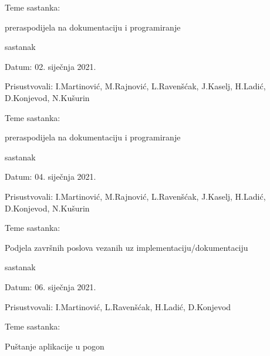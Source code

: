 \begin{packed_enum}
\begin{packed_item}
				\item Teme sastanka: 
				\begin{packed_item}
					\item   preraspodijela na dokumentaciju i programiranje
				\end{packed_item}
			\end{packed_item}
				\item sastanak
				\item[] \begin{packed_item}
					\item Datum: 02. siječnja 2021.
					\item Prisustvovali: I.Martinović, M.Rajnović, L.Ravenšćak, J.Kaselj, H.Ladić, D.Konjevod, N.Kušurin
					\item Teme sastanka: 
					\begin{packed_item}
						\item   preraspodijela na dokumentaciju i programiranje
					\end{packed_item}
				\end{packed_item}
			\item sastanak
			\item[] \begin{packed_item}
				\item Datum: 04. siječnja 2021.
				\item Prisustvovali: I.Martinović, M.Rajnović, L.Ravenšćak, J.Kaselj, H.Ladić, D.Konjevod, N.Kušurin
				\item Teme sastanka: 
				\begin{packed_item}
					\item  Podjela završnih poslova vezanih uz implementaciju/dokumentaciju
				\end{packed_item}
			\end{packed_item}
		\item sastanak
		\item[] \begin{packed_item}
			\item Datum: 06. siječnja 2021.
			\item Prisustvovali: I.Martinović,  L.Ravenšćak,  H.Ladić, D.Konjevod
			\item Teme sastanka: 
			\begin{packed_item}
				\item   Puštanje aplikacije u pogon
			\end{packed_item}
		\end{packed_item}
\item[] \begin{packed_item}

\end{packed_item}
\end{packed_enum}
